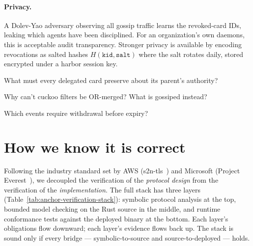 \documentclass[11pt,a4paper]{article}
\theoremstyle{definition}
\begin{document}


\paragraph{Privacy.} A Dolev-Yao adversary observing all gossip traffic learns the revoked-card IDs, leaking which agents have been disciplined. For an organization's own daemons, this is acceptable audit transparency. Stronger privacy is available by encoding revocations as salted hashes $H(\texttt{kid}, \texttt{salt})$ where the salt rotates daily, stored encrypted under a harbor session key.

\begin{pdrecitation}
\item What must every delegated card preserve about its parent's authority?
\item Why can't cuckoo filters be OR-merged? What is gossiped instead?
\item Which events require withdrawal before expiry?
\end{pdrecitation}

\section{How we know it is correct}\label{sec:correct}

Following the industry standard set by AWS (s2n-tls~) and Microsoft (Project Everest~), we decoupled the verification of the \textit{protocol design} from the verification of the \textit{implementation}. The full stack has three layers (Table~\ref{tab:anchor-verification-stack}): symbolic protocol analysis at the top, bounded model checking on the Rust source in the middle, and runtime conformance tests against the deployed binary at the bottom. Each layer's obligations flow downward; each layer's evidence flows back up. The stack is sound only if every bridge --- symbolic-to-source and source-to-deployed --- holds.
\end{document}
